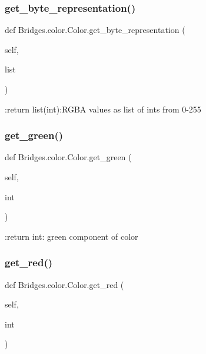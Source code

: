 \subsubsection{\texorpdfstring{get\+\_\+byte\+\_\+representation()}{get\_byte\_representation()}}
{\footnotesize\ttfamily def Bridges.\+color.\+Color.\+get\+\_\+byte\+\_\+representation (\begin{DoxyParamCaption}\item[{}]{self,  }\item[{}]{list }\end{DoxyParamCaption})}

\begin{DoxyVerb}:return list(int):RGBA values as list of ints from 0-255\end{DoxyVerb}
 \mbox{\label{class_bridges_1_1color_1_1_color_ad4395417f67ab98115dbe61f50f82ac3}} 
\subsubsection{\texorpdfstring{get\+\_\+green()}{get\_green()}}
{\footnotesize\ttfamily def Bridges.\+color.\+Color.\+get\+\_\+green (\begin{DoxyParamCaption}\item[{}]{self,  }\item[{}]{int }\end{DoxyParamCaption})}

\begin{DoxyVerb}:return int: green component of color\end{DoxyVerb}
 \mbox{\label{class_bridges_1_1color_1_1_color_a1b6e88d20dc472eb03739811856d8cb8}} 
\subsubsection{\texorpdfstring{get\+\_\+red()}{get\_red()}}
{\footnotesize\ttfamily def Bridges.\+color.\+Color.\+get\+\_\+red (\begin{DoxyParamCaption}\item[{}]{self,  }\item[{}]{int }\end{DoxyParamCaption})}

